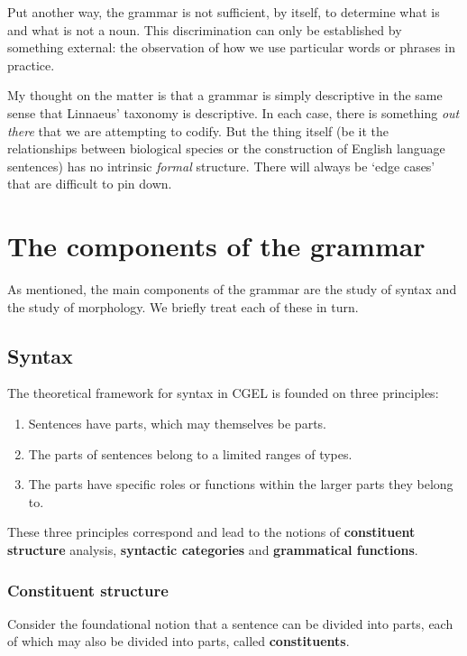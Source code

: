 \documentclass{scrarticle}
\begin{document}
Put another way, the grammar is not sufficient, by itself, to determine what is and what is not a
noun. This discrimination can only be established by something external: the observation of how we
use particular words or phrases in practice.

My thought on the matter is that a grammar is simply descriptive in the same sense that Linnaeus’
taxonomy is descriptive. In each case, there is something \emph{out there} that we are attempting to
codify. But the thing itself (be it the relationships between biological species or the construction
of English language sentences) has no intrinsic \emph{formal} structure. There will always be `edge
cases' that are difficult to pin down.


\section{The components of the grammar}

As mentioned, the main components of the grammar are the study of syntax and the study of
morphology. We briefly treat each of these in turn.

\subsection{Syntax}

The theoretical framework for syntax in CGEL is founded on three principles:

\begin{enumerate}
    \item Sentences have parts, which may themselves be parts.
    \item The parts of sentences belong to a limited ranges of types.
    \item The parts have specific roles or functions within the larger parts they belong to.
\end{enumerate}

These three principles correspond and lead to the notions of \textbf{constituent structure} analysis,
\textbf{syntactic categories} and \textbf{grammatical functions}.

\subsubsection{Constituent structure}

Consider the foundational notion that a sentence can be divided into parts, each of which may also
be divided into parts, called \textbf{constituents}.
\end{document}
